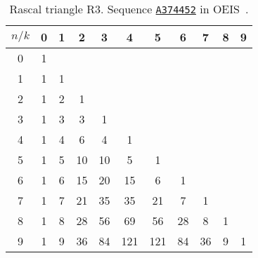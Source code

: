\begin{table}[H]
    \begin{center}
        \begin{tabular}{c|cccccccccc}
            $n/k$ & 0 & 1 & 2  & 3  & 4   & 5   & 6  & 7  & 8 & 9 \\
            \hline
            0     & 1 &   &    &    &     &     &    &    &   &   \\
            1     & 1 & 1 &    &    &     &     &    &    &   &   \\
            2     & 1 & 2 & 1  &    &     &     &    &    &   &   \\
            3     & 1 & 3 & 3  & 1  &     &     &    &    &   &   \\
            4     & 1 & 4 & 6  & 4  & 1   &     &    &    &   &   \\
            5     & 1 & 5 & 10 & 10 & 5   & 1   &    &    &   &   \\
            6     & 1 & 6 & 15 & 20 & 15  & 6   & 1  &    &   &   \\
            7     & 1 & 7 & 21 & 35 & 35  & 21  & 7  & 1  &   &   \\
            8     & 1 & 8 & 28 & 56 & 69  & 56  & 28 & 8  & 1 &   \\
            9     & 1 & 9 & 36 & 84 & 121 & 121 & 84 & 36 & 9 & 1
        \end{tabular}
    \end{center}
    \caption{Rascal triangle R3. Sequence \href{https://oeis.org/A374452}{\texttt{A374452}} in OEIS~\cite{sloane2003oeis}.}
    \label{tab:r3-triangle}
\end{table}
